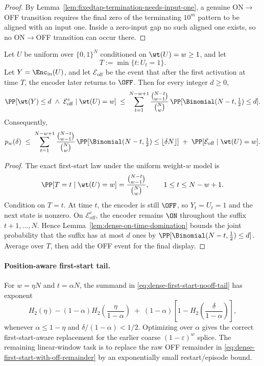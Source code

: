 \begin{proof}
By Lemma~\ref{lem:fixedtap-termination-needs-input-one}, a genuine ON\(\to\)OFF transition requires the final zero of
the terminating \(10^m\) pattern to be aligned with an input one. Inside a zero-input gap no such aligned one exists,
so no ON\(\to\)OFF transition can occur there.
\end{proof}

\begin{lemma}
\label{lem:dense-first-start-nooff-tail}
Let \(U\) be uniform over \(\{0,1\}^N\) conditioned on \(\wt(U)=w\ge 1\), and let
\[
T:=\min\{t:U_t=1\}.
\]
Let \(Y=\Enc_{\mathrm{in}}(U)\), and let \(\mathcal{E}_{\mathrm{off}}\) be the event that after the first activation
at time \(T\), the encoder later returns to \(\OFF\). Then for every integer \(d\ge 0\),
\begin{equation}
\label{eq:dense-first-start-nooff-tail}
\PP[\wt(Y)\le d\ \wedge\ \mathcal{E}_{\mathrm{off}}^c\mid \wt(U)=w]
\;\le\;
\sum_{t=1}^{N-w+1}
\frac{\binom{N-t}{w-1}}{\binom{N}{w}}\,
\PP[\Binomial(N-t,\tfrac12)\le d].
\end{equation}
Consequently,
\begin{equation}
\label{eq:dense-first-start-with-off-remainder}
p_w(\delta)
\;\le\;
\sum_{t=1}^{N-w+1}
\frac{\binom{N-t}{w-1}}{\binom{N}{w}}\,
\PP[\Binomial(N-t,\tfrac12)\le \lfloor\delta N\rfloor]
\;+\;
\PP[\mathcal{E}_{\mathrm{off}}\mid \wt(U)=w].
\end{equation}
\end{lemma}

\begin{proof}
The exact first-start law under the uniform weight-\(w\) model is
\[
\PP[T=t\mid \wt(U)=w]
=
\frac{\binom{N-t}{w-1}}{\binom{N}{w}},
\qquad 1\le t\le N-w+1.
\]
Condition on \(T=t\). At time \(t\), the encoder is still \(\OFF\), so \(Y_t=U_t=1\) and the next state is nonzero.
On \(\mathcal{E}_{\mathrm{off}}^c\), the encoder remains \(\ON\) throughout the suffix \(t+1,\dots,N\). Hence
Lemma~\ref{lem:dense-on-time-domination} bounds the joint probability that the suffix has at most \(d\) ones by
\(\PP[\Binomial(N-t,\tfrac12)\le d]\). Average over \(T\), then add the OFF event for the final display.
\end{proof}

\paragraph{Position-aware first-start tail.}
For \(w=\eta N\) and \(t=\alpha N\), the summand in
\eqref{eq:dense-first-start-nooff-tail} has exponent
\[
H_2(\eta)
-
(1-\alpha)H_2\!\left(\frac{\eta}{1-\alpha}\right)
\;+\;
(1-\alpha)
\left[
1-H_2\!\left(\frac{\delta}{1-\alpha}\right)
\right],
\]
whenever \(\alpha\le 1-\eta\) and \(\delta/(1-\alpha)<1/2\). Optimizing over \(\alpha\) gives the correct
first-start-aware replacement for the earlier coarse \((1-\varepsilon)^w\) splice. The remaining linear-window task is
to replace the raw OFF remainder in \eqref{eq:dense-first-start-with-off-remainder} by an exponentially small
restart/episode bound.

